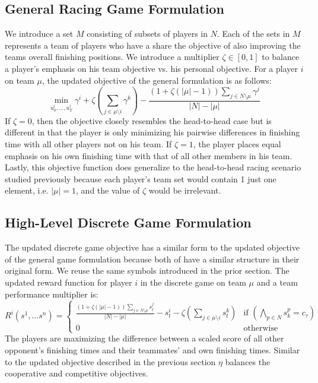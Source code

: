 \subsection{General Racing Game Formulation}
We introduce a set $M$ consisting of subsets of players in $N$. Each of the sets in $M$ represents a team of players who have a share the objective of also improving the teams overall finishing positions. We introduce a multiplier $\zeta \in [0,1]$ to balance a player's emphasis on his team objective vs. his personal objective. For a player $i$ on team $\mu$, the updated objective of the general formulation is as follows:
\begin{equation} \label{eq:gen_team_obj}
    \min_{u^i_0, ..., u^i_T} \gamma^i+\zeta (\sum_{j \in \mu \setminus i} \gamma^k) - \frac{(1+\zeta(|\mu|-1))\sum_{j \in N \setminus \mu }\gamma^j}{|N|-|\mu|} 
\end{equation}
If $\zeta=0$, then the objective closely resembles the head-to-head case but is different in that the player is only minimizing his pairwise differences in finishing time with all other players not on his team. If $\zeta=1$, the player places equal emphasis on his own finishing time with that of all other members in his team. Lastly, this objective function does generalize to the head-to-head racing scenario studied previously because each player's team set would contain 1 just one element, i.e. $|\mu|=1$, and the value of $\zeta$ would be irrelevant. 

\subsection{High-Level Discrete Game Formulation}
The updated discrete game objective has a similar form to the updated objective of the general game formulation because both of have a similar structure in their original form. We reuse the same symbols introduced in the prior section. The updated reward function for player $i$ in the discrete game on team $\mu$ and a team performance multiplier is:
\begin{equation}
    R^i(s^1, ... s^n) = \begin{cases} 
                \frac{(1+\zeta(|\mu|-1))\sum_{j \in N \setminus \mu} s^j_t}{|N|-|\mu|} - s^i_t - \zeta(\sum_{j \in \mu \setminus i} s^k_t) & \text{if } (\bigwedge_{p \in N} s^p_k   = c_\tau) \\ 
                0    & \text{otherwise}
                \end{cases}
\end{equation}
 The players are maximizing the difference between a scaled score of all other opponent's finishing times and their teammates' and own finishing times. Similar to the updated objective described in the previous section $\eta$ balances the cooperative and competitive objectives.
